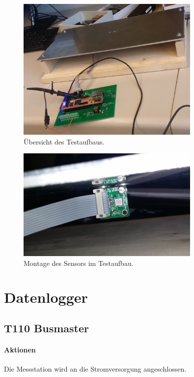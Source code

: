 \begin{figure}
	\centering
		\includegraphics[width=0.8\textwidth]{images/fotos/testaufbau1.jpg}
	\caption{Übersicht des Testaufbaus.}
	\label{fig.testaufbau1}
\end{figure}

\begin{figure}
	\centering
		\includegraphics[width=0.8\textwidth]{images/fotos/testaufbau2.jpg}
	\caption{Montage des Sensors im Testaufbau.}
	\label{fig.testaufbau2}
\end{figure}

\section{Datenlogger}
\subsection{T110 Busmaster}
\paragraph{Aktionen} Die Messstation wird an die Stromversorgung angeschlossen.

